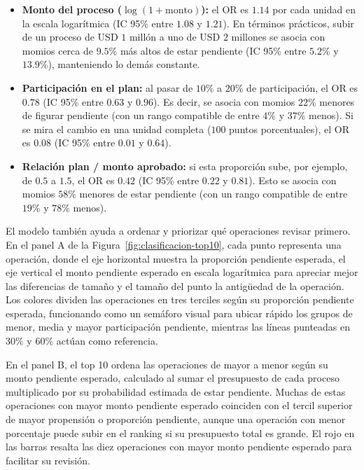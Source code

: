 \documentclass[11pt,letterpaper]{article}
\begin{document}
	\begin{itemize}
		\item \textbf{Monto del proceso ($\log(1 + \text{monto})$):} el OR es $1.14$ por cada unidad en la escala logarítmica (IC 95\% entre $1.08$ y $1.21$). En términos prácticos, subir de un proceso de USD $1$ millón a uno de USD $2$ millones se asocia con momios cerca de $9.5\%$ más altos de estar pendiente (IC 95\% entre $5.2\%$ y $13.9\%$), manteniendo lo demás constante.
		\item \textbf{Participación en el plan:} al pasar de $10\%$ a $20\%$ de participación, el OR es $0.78$ (IC 95\% entre $0.63$ y $0.96$). Es decir, se asocia con momios $22\%$ menores de figurar pendiente (con un rango compatible de entre $4\%$ y $37\%$ menos). Si se mira el cambio en una unidad completa ($100$ puntos porcentuales), el OR es $0.08$ (IC 95\% entre $0.01$ y $0.64$).
		\item \textbf{Relación plan / monto aprobado:} si esta proporción sube, por ejemplo, de $0.5$ a $1.5$, el OR es $0.42$ (IC 95\% entre $0.22$ y $0.81$). Esto se asocia con momios $58\%$ menores de estar pendiente (con un rango compatible de entre $19\%$ y $78\%$ menos).
	\end{itemize}
	
	
	El modelo también ayuda a ordenar y priorizar qué operaciones revisar primero. En el panel A de la Figura~\ref{fig:clasificacion-top10}, cada punto representa una operación, donde el eje horizontal muestra la proporción pendiente esperada, el eje vertical el monto pendiente esperado en escala logarítmica para apreciar mejor las diferencias de tamaño y el tamaño del punto la antigüedad de la operación. Los colores dividen las operaciones en tres terciles según su proporción pendiente esperada, funcionando como un semáforo visual para ubicar rápido los grupos de menor, media y mayor participación pendiente, mientras las líneas punteadas en 30\% y 60\% actúan como referencia.
	
	\medspace
	
	En el panel B, el top 10 ordena las operaciones de mayor a menor según su monto pendiente esperado, calculado al sumar el presupuesto de cada proceso multiplicado por su probabilidad estimada de estar pendiente. Muchas de estas operaciones con mayor monto pendiente esperado coinciden con el tercil superior de mayor propensión o proporción pendiente, aunque una operación con menor porcentaje puede subir en el ranking si su presupuesto total es grande. El rojo en las barras resalta las diez operaciones con mayor monto pendiente esperado para facilitar su revisión.
	
\end{document}
